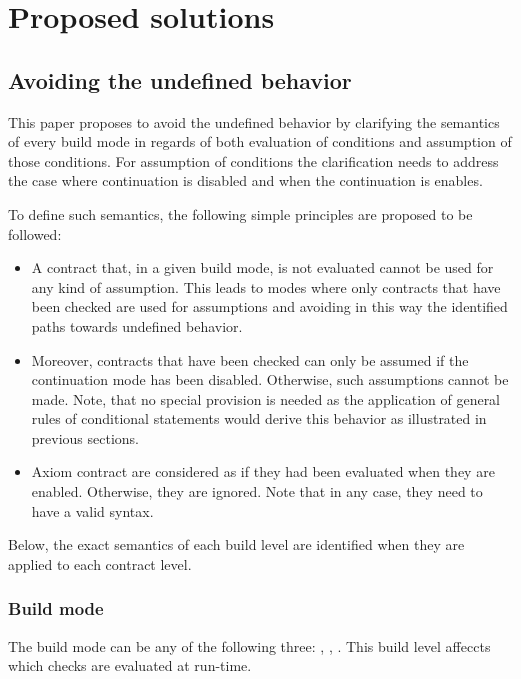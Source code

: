 \section{Proposed solutions}

\subsection{Avoiding the undefined behavior}

This paper proposes to avoid the undefined behavior by clarifying the semantics of every
build mode in regards of both evaluation of conditions and assumption of those
conditions. For assumption of conditions the clarification needs to address the
case where continuation is disabled and when the continuation is enables.

To define such semantics, the following simple principles are proposed to be followed:

\begin{itemize}

\item A contract that, in a given build mode, is not evaluated cannot be used
for any kind of assumption. This leads to modes where only contracts that have
been checked are used for assumptions and avoiding in this way the identified
paths towards undefined behavior.

\item Moreover, contracts that have been checked can only be assumed if the
continuation mode has been disabled. Otherwise, such assumptions cannot be made.
Note, that no special provision is needed as the application of general rules
of conditional statements would derive this behavior as illustrated in previous
sections.

\item Axiom contract are considered as if they had been evaluated 
when they are enabled. Otherwise, they are ignored.
Note that in any case, they need to have a valid syntax.

\end{itemize}

Below, the exact semantics of each build level are identified when 
they are applied
to each contract level.

\subsubsection{Build mode}

The build mode can be any of the following three: , , 
. This build level affeccts which checks are evaluated at run-time.

